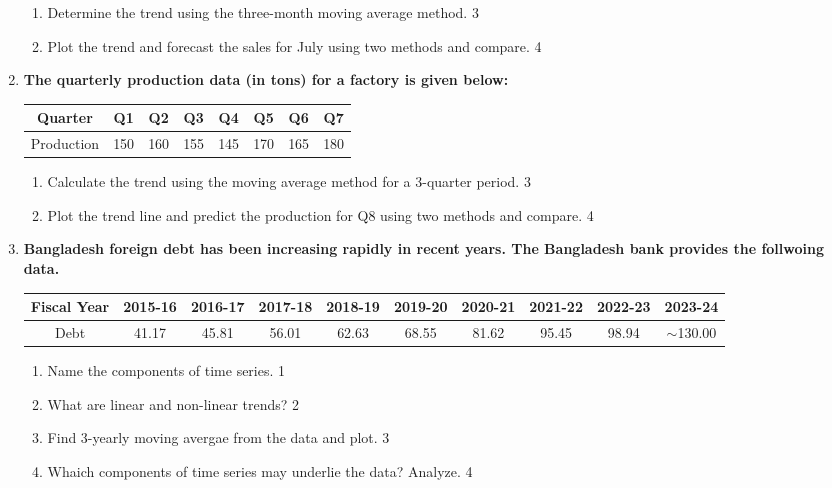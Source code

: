 \documentclass[a4paper,oneside]{book}
\begin{document}
\begin{enumerate}
\begin{enumerate}
\item
Determine the trend using the three-month moving average method. \hfill 3
\item
Plot the trend and forecast the sales for July using two methods 
and compare. \hfill 4
\end{enumerate}

\item
\textbf{The quarterly production data (in tons) for a factory is given below:}

\begin{table}[h]
\centering
\begin{tabular}{cccccccc}
Quarter    & Q1     & Q2     & Q3     & Q4     & Q5     & Q6     & Q7     \\ \hline
Production & 150    & 160    & 155    & 145    & 170    & 165    & 180    \\
\end{tabular}
\end{table}

\begin{enumerate}
\item
Calculate the trend using the moving average method for a 3-quarter period. \hfill 3
\item
Plot the trend line and predict the production for Q8 using two methods 
and compare. \hfill 4
\end{enumerate}


  
     \item
	  \textbf{Bangladesh foreign debt has been increasing rapidly in recent years. The Bangladesh bank provides the follwoing data.}
	  
	  \begin{table}[h]
	  \centering
\begin{tabular}{c|c|c|c|c|c|c|c|c|c}
Fiscal Year & 2015-16 & 2016-17 & 2017-18 & 2018-19 & 2019-20 & 2020-21 & 2021-22 & 2022-23 & 2023-24 \\ \hline
Debt & 41.17 & 45.81 & 56.01 & 62.63 & 68.55 & 81.62 & 95.45 & 98.94 & $\sim$130.00
\end{tabular}
\end{table}
  
  \begin{enumerate}
    \item
	Name the components of time series. \hfill 1
    \item
	What are linear and non-linear trends? \hfill 2
    \item  
	Find 3-yearly moving avergae from the data and plot. \hfill 3
    \item
	Whaich components of time series may underlie the data? Analyze. \hfill 4
  \end{enumerate}


\end{enumerate}
\end{document}
